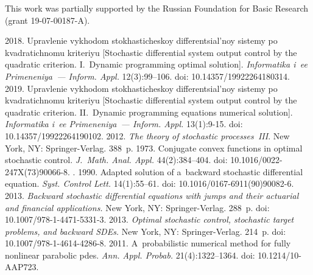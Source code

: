 




\Ack
\noindent
This work was partially supported by the Russian Foundation for
Basic Research (grant  19-07-00187-A).



  \begin{multicols}{2}

\renewcommand{\bibname}{\protect\rmfamily References}

{\small\frenchspacing
 {%
 \begin{thebibliography}{99}
 2018. Upravlenie vykhodom 
stokhasticheskoy differentsial'noy sistemy po kvadratichnomu kriteriyu 
[Stochastic differential system output control by the quadratic criterion. 
I.~Dynamic programming optimal solution]. \textit{Informatika i~ee 
Primeneniya~--- Inform. Appl.} 12(3):99--106.
doi: 
10.14357/19922264180314.
 2019. Upravlenie vykhodom 
stokhasticheskoy differentsial'noy sistemy po kvadratichnomu kriteriyu 
[Stochastic differential system output control by the quadratic criterion. 
II.~Dynamic programming equations numerical solution]. \textit{Informatika 
i~ee Primeneniya~--- Inform. Appl.} 13(1):9-15.
doi: 
10.14357/19922264190102.
 2012. \textit{The theory of 
stochastic processes~III}. New York, NY: Springer-Verlag. 388~p.
 1973. Conjugate convex functions in optimal stochastic 
control. \textit{J.~Math. Anal. Appl.} 44(2):384--404.
doi: 
10.1016/0022-247X(73)90066-8.
. 1990. Adapted solution of a~backward 
stochastic differential equation. \textit{Syst. Control Lett.} 14(1):55--61.
doi: 10.1016/0167-6911(90)90082-6.
 2013. \textit{Backward stochastic differential equations with 
jumps and their actuarial and financial applications.} New York, NY: 
Springer-Verlag. 288~p. doi: 10.1007/978-1-4471-5331-3.
 2013. \textit{Optimal stochastic control, stochastic target 
problems, and backward SDEs.} New York, NY: Springer-Verlag. 214~p.
doi: 
10.1007/978-1-4614-4286-8.
 2011. A~probabilistic numerical 
method for fully nonlinear parabolic pdes. \textit{Ann. Appl. Probab.} 
21(4):1322--1364. doi: 10.1214/10-AAP723.


\end{thebibliography}}}
\end{multicols}
